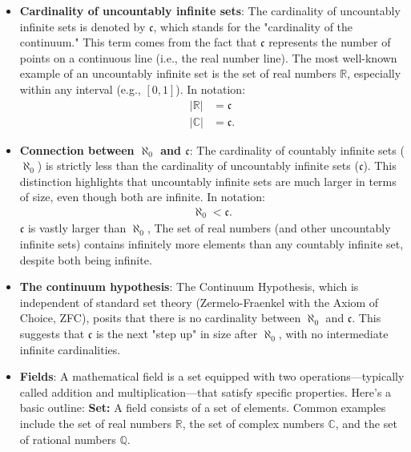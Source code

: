 \documentclass{report}
\begin{document}
\begin{itemize}
        \item \textbf{Cardinality of uncountably infinite sets}:
            The cardinality of uncountably infinite sets is denoted by \(\mathfrak{c}\), which stands for the "cardinality of the continuum."  This term comes from the fact that \(\mathfrak{c}\) represents the number of points on a continuous line (i.e., the real number line). 
            \bigbreak \noindent 
            The most well-known example of an uncountably infinite set is the set of real numbers \(\mathbb{R}\), especially within any interval (e.g., \([0,1]\)).
            \bigbreak \noindent 
            In notation: 
            \begin{align*}
                |\mathbb{R}| &= \mathfrak{c} \\
                |\mathbb{C}| &= \mathfrak{c}
            .\end{align*}
        \item \textbf{Connection between $\aleph_{0}$ and $\mathfrak{c} $}: The cardinality of countably infinite sets (\(\aleph_0\)) is strictly less than the cardinality of uncountably infinite sets (\(\mathfrak{c}\)). This distinction highlights that uncountably infinite sets are much larger in terms of size, even though both are infinite.
            \bigbreak \noindent 
            In notation: 
            \begin{align*}
                \aleph_0 < \mathfrak{c}
            .\end{align*}
            \bigbreak \noindent 
            $\mathfrak{c}$ is vastly larger than $\aleph_{0}$, The set of real numbers (and other uncountably infinite sets) contains infinitely more elements than any countably infinite set, despite both being infinite.
        \item \textbf{The continuum hypothesis}: The Continuum Hypothesis, which is independent of standard set theory (Zermelo-Fraenkel with the Axiom of Choice, ZFC), posits that there is no cardinality between \(\aleph_0\) and \(\mathfrak{c}\). This suggests that \(\mathfrak{c}\) is the next "step up" in size after \(\aleph_0\), with no intermediate infinite cardinalities.
        \item \textbf{Fields}:
            A mathematical field is a set equipped with two operations—typically called addition and multiplication—that satisfy specific properties. Here's a basic outline:
            \bigbreak \noindent 
            \textbf{Set:} A field consists of a set of elements. Common examples include the set of real numbers \(\mathbb{R}\), the set of complex numbers \(\mathbb{C}\), and the set of rational numbers \(\mathbb{Q}\).

\end{itemize}
\end{document}
